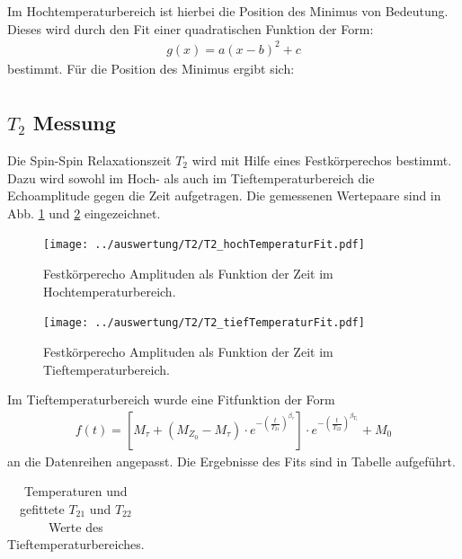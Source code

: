 Im Hochtemperaturbereich ist hierbei die Position des Minimus von Bedeutung. Dieses wird durch den Fit einer quadratischen Funktion der Form:
\begin{align}
	g(x) = a(x-b)^2+c
\end{align}
bestimmt. Für die Position des Minimus ergibt sich:
\begin{align*}
	
\end{align*}

\newpage
\subsection{$T_2$ Messung}
Die Spin-Spin Relaxationszeit $T_2$ wird mit Hilfe eines Festkörperechos bestimmt. Dazu wird sowohl im Hoch- als auch im Tieftemperaturbereich die Echoamplitude gegen die Zeit aufgetragen. Die gemessenen Wertepaare sind in Abb. \ref{pic_T2_hoch} und \ref{pic_T2_tief} eingezeichnet.
\begin{figure}[htbp]
	\texttt{[image: ../auswertung/T2/T2\_hochTemperaturFit.pdf]}
	\caption{Festkörperecho Amplituden als Funktion der Zeit im Hochtemperaturbereich.}
	\label{pic_T2_hoch}
\end{figure}
\begin{figure}[htbp]
	\texttt{[image: ../auswertung/T2/T2\_tiefTemperaturFit.pdf]}
	\caption{Festkörperecho Amplituden als Funktion der Zeit im Tieftemperaturbereich.}
	\label{pic_T2_tief}
\end{figure}

Im Tieftemperaturbereich wurde eine Fitfunktion der Form
\begin{align}
	f(t) = \left[ M_\tau+(M_{Z_0}-M_\tau)\cdot e^{-\left(\frac{t}{T_{21}}\right)^{\beta_\tau}} \right] \cdot e^{-\left(\frac{t}{T_{22}}\right)^{\beta_{T_1}}}+M_0
\end{align}
an die Datenreihen angepasst. Die Ergebnisse des Fits sind in Tabelle aufgeführt.
\begin{table}[htbp]
	\begin{tabular}{| >{$}c<{$} | >{$}c<{$} | >{$}c<{$} |>{$}c<{$} | >{$}c<{$} |}
		
	\end{tabular}
	\caption{Temperaturen und gefittete $T_{21}$ und $T_{22}$ Werte des Tieftemperaturbereiches.}
	\label{tab:T1_tief}
\end{table}


\newpage
